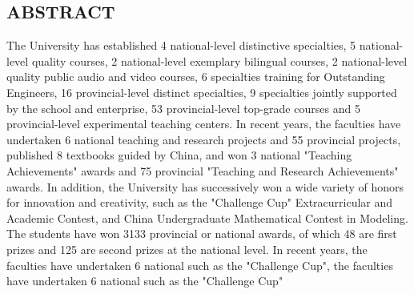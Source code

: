 \begin{ujnabstract*}
\section{ABSTRACT}
\begin{spacing}{1.4}\normalsize{
The University has established 4 national-level distinctive specialties, 5 national-level quality courses, 2 national-level exemplary bilingual courses, 2 national-level quality public audio and video courses, 6 specialties training for Outstanding Engineers, 16 provincial-level distinct specialties, 9 specialties jointly supported by the school and enterprise, 53 provincial-level top-grade courses and 5 provincial-level experimental teaching centers. In recent years, the faculties have undertaken 6 national teaching and research projects and 55 provincial projects, published 8 textbooks guided by China, and won 3 national "Teaching Achievements" awards and 75 provincial "Teaching and Research Achievements" awards. In addition, the University has successively won a wide variety of honors for innovation and creativity, such as the "Challenge Cup" Extracurricular and Academic Contest, and China Undergraduate Mathematical Contest in Modeling. The students have won 3133 provincial or national awards, of which 48 are first prizes and 125 are second prizes at the national level. In recent years, the faculties have undertaken 6 national such as the "Challenge Cup", the faculties have undertaken 6 national such as the "Challenge Cup"
}\end{spacing}
\begin{spacing}{0.9}
\small{}
\end{spacing}
\end{ujnabstract*}
